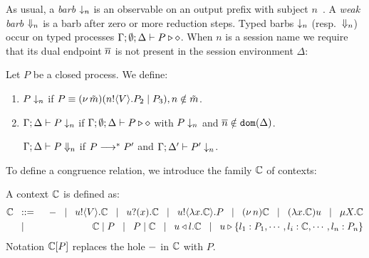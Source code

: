 \documentclass[runningheads]{llncs}
\begin{document}
{%

As usual, a \emph{barb} $\downarrow_{n}$ is an observable on an output prefix with subject $n$~\cite{MiSa92}.
A \emph{weak barb} $\Downarrow_{n}$ is a barb after zero or more reduction steps.
Typed barbs $\downarrow_{n}$ (resp.\ $\Downarrow_{n}$)
occur on typed processes $\Gamma; \emptyset; \Delta \vdash P \triangleright \diamond$.
When $n$ is a session name we require that its dual endpoint $\overline{n}$ is not present
in the session environment $\Delta$:

\begin{definition}[Barbs]%
	Let $P$ be a closed process. We define:
	\begin{enumerate}[1.]
		\item	
		$P \downarrow_{n}$ if $P \equiv (\nu\, \tilde{m})(n ! \langle V \rangle . P_2 \;|\; P_3), n \notin \tilde{m}$. %

		\item	$\Gamma; \Delta \vdash P \downarrow_{n}$ if
			$\Gamma; \emptyset; \Delta \vdash P \triangleright \diamond$ with $P \downarrow_{n}$ and $\overline{n} \notin \mathtt{dom}(\Delta)$.

			$\Gamma; \Delta \vdash P \Downarrow_{n}$ if $P \longrightarrow^* P'$ and
			$\Gamma; \Delta' \vdash P' \downarrow_{n}$.			
	\end{enumerate}
\end{definition}



To define a congruence relation, we introduce the family ${\mathbb{C}}$ of contexts:

\begin{definition}[Context]
	A context ${\mathbb{C}}$ is defined as:
\begin{eqnarray*}
		{\mathbb{C}} & \;\;::=\;\; &  - \;\;\;|\;\;\; u ! \langle V \rangle . {\mathbb{C}} \;\;\;|\;\;\; u ? (x) . {\mathbb{C}} \;\;\;|\;\;\; u ! \langle \lambda x.{\mathbb{C}} \rangle . P \;\;\;|\;\;\; (\nu\, n) {\mathbb{C}}
		\;\;\;|\;\;\; (\lambda x.{\mathbb{C}})u \;\;\;|\;\;\; \mu X. {\mathbb{C}}  
		\\
		& \;\;\;|\;\;\; &  {\mathbb{C}} \;|\; P \;\;\;|\;\;\; P \;|\; {\mathbb{C}} \;\;\;|\;\;\; u \triangleleft l . {\mathbb{C}} \;\;\;|\;\;\; u \triangleright \{l_1:P_1,\cdots,l_i:{\mathbb{C}},\cdots,l_n:P_n\} 
	\end{eqnarray*}
Notation ${\mathbb{C}}[P]$ replaces 
the hole $-$ in ${\mathbb{C}}$ with $P$.
\end{definition}

}
\end{document}
